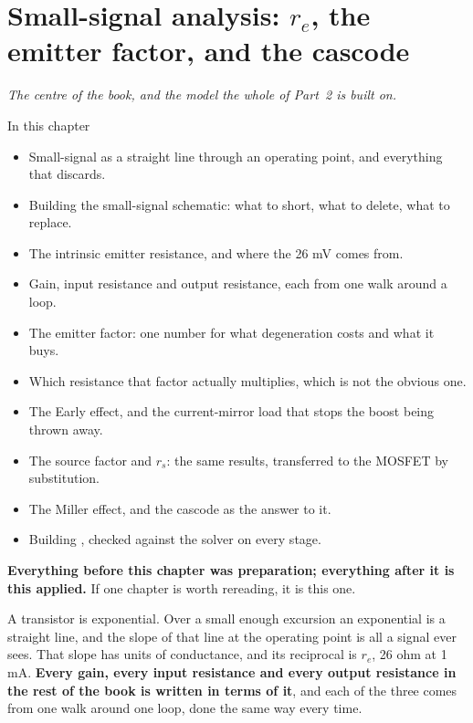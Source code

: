 
\chapter{Small-signal analysis: \texorpdfstring{$r_e$}{r\_e}, the emitter factor, and the cascode}
\label{c7:ch:smallsignal}

{\large\itshape The centre of the book, and the model the whole of Part~2 is built on.\par}

\begin{chapterbox}{In this chapter}
\begin{itemize}
  \item Small-signal as a straight line through an operating point, and everything that discards.
  \item Building the small-signal schematic: what to short, what to delete, what to replace.
  \item The intrinsic emitter resistance, and where the 26 mV comes from.
  \item Gain, input resistance and output resistance, each from one walk around a loop.
  \item The emitter factor: one number for what degeneration costs and what it buys.
  \item Which resistance that factor actually multiplies, which is not the obvious one.
  \item The Early effect, and the current-mirror load that stops the boost being thrown away.
  \item The source factor and $r_s$: the same results, transferred to the MOSFET by substitution.
  \item The Miller effect, and the cascode as the answer to it.
  \item Building , checked against the solver on every stage.
\end{itemize}
\end{chapterbox}

\textbf{Everything before this chapter was preparation; everything after it is this applied.} If
one chapter is worth rereading, it is this one.

A transistor is exponential. Over a small enough excursion an exponential is a straight line, and
the slope of that line at the operating point is all a signal ever sees. That slope has units of
conductance, and its reciprocal is $r_e$, 26 ohm at 1 mA. \textbf{Every gain, every input
resistance and every output resistance in the rest of the book is written in terms of it}, and each
of the three comes from one walk around one loop, done the same way every time.

